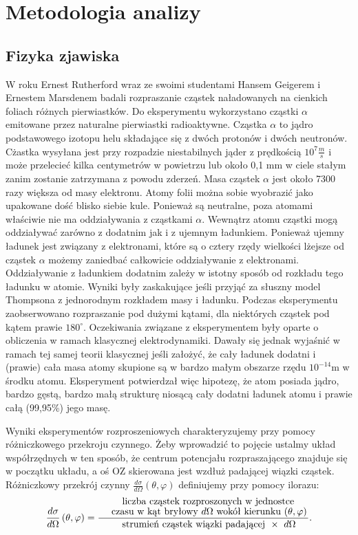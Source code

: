 \documentclass[11pt]{book}
\theoremstyle{definition}
\begin{document}
\chapter{Metodologia analizy}

\section{Fizyka zjawiska}

W roku Ernest Rutherford wraz ze swoimi studentami Hansem Geigerem i Ernestem Marsdenem badali rozpraszanie cząstek naładowanych na cienkich foliach różnych pierwiastków. Do eksperymentu wykorzystano cząstki $\alpha$ emitowane przez naturalne pierwiastki radioaktywne. Cząstka $\alpha$ to jądro podstawowego izotopu helu składające się z dwóch protonów i dwóch neutronów. Cżastka wysyłana jest przy rozpadzie niestabilnych jąder z prędkością $10^7 \frac{\si{m}}{\si{s}}$ i może przelecieć kilka centymetrów w powietrzu lub około 0,1 mm w ciele stałym zanim zostanie zatrzymana z powodu zderzeń. Masa cząstek $\alpha$ jest około 7300 razy większa od masy elektronu. Atomy folii można sobie wyobrazić jako upakowane dość blisko siebie kule. Ponieważ są neutralne, poza atomami właściwie nie ma oddziaływania z cząstkami $\alpha$. Wewnątrz atomu cząstki mogą oddziaływać zarówno z dodatnim jak i z ujemnym ładunkiem. Ponieważ ujemny ładunek jest
związany z elektronami, które są o cztery rzędy wielkości lżejsze od cząstek $\alpha$ możemy zaniedbać całkowicie oddziaływanie z elektronami. Oddziaływanie z ładunkiem dodatnim zależy w istotny sposób od rozkładu tego ładunku w atomie. 
Wyniki były zaskakujące jeśli przyjąć za słuszny model Thompsona z jednorodnym rozkładem masy i ładunku.  Podczas eksperymentu zaobserwowano rozpraszanie pod dużymi kątami, dla niektórych cząstek pod kątem prawie $180^{\circ}$. Oczekiwania związane z eksperymentem były oparte o obliczenia w ramach klasycznej elektrodynamiki. Dawały się jednak wyjaśnić w ramach tej samej teorii klasycznej jeśli założyć, że cały ładunek dodatni i (prawie) cała masa atomy skupione są w bardzo małym obszarze rzędu $10^{-14}$m w środku atomu. Eksperyment potwierdzał więc hipotezę, że atom posiada jądro, bardzo gęstą, bardzo małą strukturę niosącą cały dodatni ładunek atomu i prawie całą (99,95\%) jego masę.
%

Wyniki eksperymentów rozproszeniowych charakteryzujemy przy pomocy różniczkowego przekroju czynnego. Żeby wprowadzić to pojęcie ustalmy układ współrzędnych w ten sposób, że centrum potencjału rozpraszającego znajduje się w początku układu, a oś OZ skierowana jest wzdłuż padającej wiązki cząstek. Różniczkowy przekrój czynny $\frac{d\sigma}{d\Omega}\left(\theta, \varphi\right)$ definiujemy przy pomocy ilorazu:
\begin{equation}
\frac{d\sigma}{d\Omega}\left(\theta, \varphi\right) = \frac{\splitfrac{\text{ \;\;\;\;\;\; liczba cząstek rozproszonych w jednostce }}{\text {czasu w kąt bryłowy $d\Omega$ wokół kierunku $\left(\theta, \varphi\right)$}}}{\text{\;\;\; strumień cząstek wiązki padającej $\; \times \; \; d\Omega$}}.
\end{equation}
\end{document}
